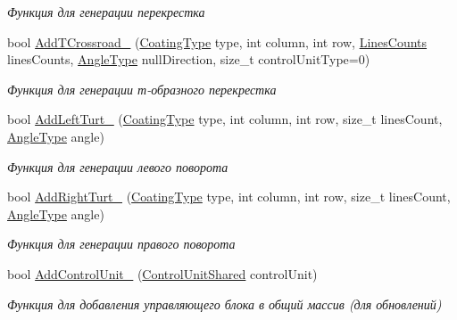 \begin{DoxyCompactItemize}
\begin{DoxyCompactList}\small\item\em Функция для генерации перекрестка \end{DoxyCompactList}\item 
bool \hyperlink{classrtm_1_1_world_controller_aa691a505a1a3c18c98974ab5a3aac5ca}{Add\+T\+Crossroad\+\_\+} (\hyperlink{namespacertm_aecd3929e64cd461eb3555b611f6fad95}{Coating\+Type} type, int column, int row, \hyperlink{namespacertm_a14457f3088a92b86a96686b72d3e4eea}{Lines\+Counts} lines\+Counts, \hyperlink{namespacertm_a69dc82b16a0148c10962caa83d930f89}{Angle\+Type} null\+Direction, size\+\_\+t control\+Unit\+Type=0)
\begin{DoxyCompactList}\small\item\em Функция для генерации т-\/образного перекрестка \end{DoxyCompactList}\item 
bool \hyperlink{classrtm_1_1_world_controller_a8c74afa75819e11feec4424cc03388f8}{Add\+Left\+Turt\+\_\+} (\hyperlink{namespacertm_aecd3929e64cd461eb3555b611f6fad95}{Coating\+Type} type, int column, int row, size\+\_\+t lines\+Count, \hyperlink{namespacertm_a69dc82b16a0148c10962caa83d930f89}{Angle\+Type} angle)
\begin{DoxyCompactList}\small\item\em Функция для генерации левого поворота \end{DoxyCompactList}\item 
bool \hyperlink{classrtm_1_1_world_controller_aa516f5455b1bad2f80e10f13f3060773}{Add\+Right\+Turt\+\_\+} (\hyperlink{namespacertm_aecd3929e64cd461eb3555b611f6fad95}{Coating\+Type} type, int column, int row, size\+\_\+t lines\+Count, \hyperlink{namespacertm_a69dc82b16a0148c10962caa83d930f89}{Angle\+Type} angle)
\begin{DoxyCompactList}\small\item\em Функция для генерации правого поворота \end{DoxyCompactList}\item 
bool \hyperlink{classrtm_1_1_world_controller_a54a03012a522c844563f092e4f0a1e60}{Add\+Control\+Unit\+\_\+} (\hyperlink{namespacertm_a64296d558b2fa02bbf5870afffd61fd9}{Control\+Unit\+Shared} control\+Unit)
\begin{DoxyCompactList}\small\item\em Функция для добавления управляющего блока в общий массив (для обновлений) \end{DoxyCompactList}\item 

\end{DoxyCompactItemize}
